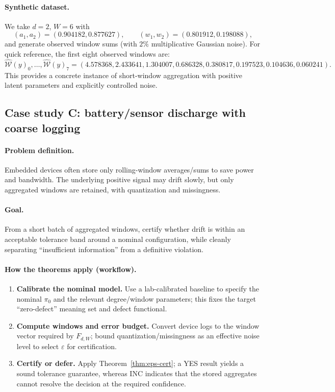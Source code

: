 \documentclass[11pt,reqno]{amsart}
\theoremstyle{definition}
\theoremstyle{remark}
\newcommand{\1}{\mathbf{1}}
\begin{document}
\paragraph{Synthetic dataset.}
We take $d=2$, $W=6$ with
\[
(a_1,a_2)=(0.904182, 0.877627),\qquad (w_1,w_2)=(0.801912, 0.198088),
\]
and generate observed window sums (with $2\%$ multiplicative Gaussian noise).
For quick reference, the first eight observed windows are:
\[
\widehat{\mathcal W}(y)_0,\dots,\widehat{\mathcal W}(y)_7
=(4.578368, 2.433641, 1.304007, 0.686328, 0.380817, 0.197523, 0.104636, 0.060241).
\]
This provides a concrete instance of short-window aggregation with positive latent parameters and explicitly controlled noise.

\subsection{Case study C: battery/sensor discharge with coarse logging}

\paragraph{Problem definition.}
Embedded devices often store only rolling-window averages/sums to save power and bandwidth. The underlying positive signal may drift slowly, but only aggregated windows are retained, with quantization and missingness.

\paragraph{Goal.}
From a short batch of aggregated windows, certify whether drift is within an acceptable tolerance band around a nominal configuration, while cleanly separating ``insufficient information'' from a definitive violation.

\paragraph{How the theorems apply (workflow).}
\begin{enumerate}
\item \textbf{Calibrate the nominal model.} Use a lab-calibrated baseline to specify the nominal $\pi_0$ and the relevant degree/window parameters; this fixes the target ``zero-defect'' meaning set and defect functional.
\item \textbf{Compute windows and error budget.} Convert device logs to the window vector required by $F_{d,W}$; bound quantization/missingness as an effective noise level to select $\varepsilon$ for certification.
\item \textbf{Certify or defer.} Apply Theorem~\ref{thm:eps-cert}; a \textsf{YES} result yields a sound tolerance guarantee, whereas \textsf{INC} indicates that the stored aggregates cannot resolve the decision at the required confidence.
\end{enumerate}
\end{document}

